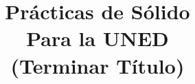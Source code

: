 \documentclass[a4paper,12pt,spanish]{report}
\begin{document}
	
	
	\title{Prácticas de Sólido\\Para la UNED\\ \Large{(Terminar Título)} }
	
	\date{}
	
	\maketitle
	
	\tableofcontents
	

	
	
	
	
	
	
	
\end{document}
